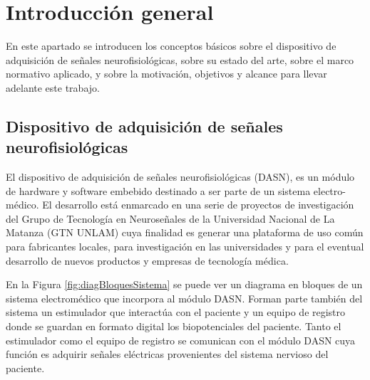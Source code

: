 
\chapter{Introducción general} %

\label{Chapter1} %
\label{IntroGeneral}


\newcommand{\keyword}[1]{\textbf{#1}}
\newcommand{\tabhead}[1]{\textbf{#1}}
\newcommand{\code}[1]{\texttt{#1}}
\newcommand{\file}[1]{\texttt{\bfseries#1}}
\newcommand{\option}[1]{\texttt{\itshape#1}}
\newcommand{\grados}{$^{\circ}$}




En este apartado se introducen los conceptos básicos sobre el dispositivo de adquisición de señales neurofisiológicas, sobre su estado del arte, sobre el marco normativo aplicado, y sobre la motivación, objetivos y alcance para llevar adelante este trabajo.

\section{Dispositivo de adquisición de señales neurofisiológicas}

El dispositivo de adquisición de señales neurofisiológicas (DASN), es un módulo de hardware y software embebido destinado a ser parte de un sistema electro-médico.
El desarrollo está enmarcado en una serie de proyectos de investigación del Grupo de Tecnología en Neuroseñales de la Universidad Nacional de La Matanza (GTN UNLAM) cuya finalidad es generar una plataforma de uso común para fabricantes locales, para investigación en las universidades y para el eventual desarrollo de nuevos productos y empresas de tecnología médica. 

En la Figura \ref{fig:diagBloquesSistema} se puede ver un diagrama en bloques de un sistema electromédico que incorpora al módulo DASN. Forman parte también del sistema un estimulador que interactúa con el paciente y un equipo de registro donde se guardan en formato digital los biopotenciales del paciente. Tanto el estimulador como el equipo de registro se comunican con el módulo DASN cuya función es adquirir señales eléctricas provenientes del sistema nervioso del paciente.

